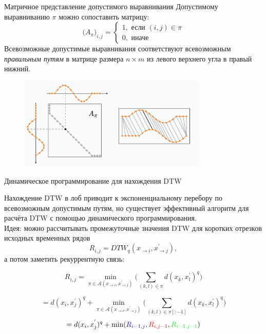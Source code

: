 \begin{frame}{Матричное представление допустимого выравнивания}
Допустимому выравниванию $\pi$ можно сопоставить матрицу:
$$ \big(A_\pi \big)_{i,j} = \begin{cases}
    1, \text{ если } (i,j) \in \pi \\
    0, \text{ иначе }
\end{cases}$$
Всевозможные допустимые выравнивания соответствуют всевозможным \textit{правильным путям} в матрице размера $n \times m$ из левого верхнего угла в правый нижний.
\begin{figure}
    \centering
    \includegraphics[width=0.8\textwidth]{lecture_7/figs/matrix_1.png}
\end{figure}
\end{frame}


\begin{frame}{Динамическое программирование для нахождения DTW}

Нахождение DTW в лоб приводит к экспоненциальному перебору по всевозможным допустимым путям, но существует эффективный алгоритм для расчёта DTW с помощью динамического программирования. \\
Идея: можно рассчитывать промежуточные значения DTW для коротких отрезков исходных временных рядов
 $$ R_{i,j} = DTW_q( x_{\rightarrow i}, x_{\rightarrow j}^{'}),$$
а потом заметить рекуррентную связь:

$$ R_{i,j}  = \min_{\pi \in \mathcal{A}(x_{\rightarrow i}, x_{\rightarrow j}^{'})}\Bigg( \sum_{(k,l) \in \pi} d(x_k, x_l^{'})^q \Bigg) $$

$$ = d(x_i, x_j^{'})^q +  \min_{\pi \in \mathcal{A}(x_{\rightarrow i}, x_{\rightarrow j}^{'})}\Bigg( \sum_{(k,l) \in \pi[:-1]} d(x_k, x_l^{'})^q \Bigg)$$
$$ = d(x_i, x_j^{'})^q  + \min(\textcolor{blue}{R_{i-1, j}}, \textcolor{red}{R_{i,j-1}}, \textcolor{green}{R_{i-1,j-1}})$$

\end{frame}

